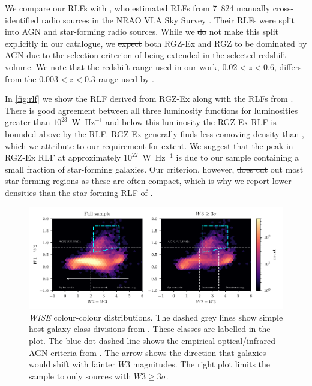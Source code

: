 \documentclass[11pt, a4paper]{book}
\providecommand{\DIFaddtex}[1]{{\protect\color{blue}\uwave{#1}}} %
\providecommand{\DIFdeltex}[1]{{\protect\color{red}\sout{#1}}}                      %
\providecommand{\DIFaddbegin}{} %
\providecommand{\DIFaddend}{} %
\providecommand{\DIFdelbegin}{} %
\providecommand{\DIFdelend}{} %
\providecommand{\DIFadd}[1]{\texorpdfstring{\DIFaddtex{#1}}{#1}} %
\providecommand{\DIFdel}[1]{\texorpdfstring{\DIFdeltex{#1}}{}} %
\newcommand{\DIFscaledelfig}{0.5}
\newlength{\DIFdelgraphicswidth} %
\newlength{\DIFdelgraphicsheight} %
\newcommand{\DIFaddincludegraphics}[2][]{{\color{blue}\fbox{\DIFOincludegraphics[#1]{#2}}}} %
\newcommand{\DIFdelincludegraphics}[2][]{%
\sbox{\DIFdelgraphicsbox}{\DIFOincludegraphics[#1]{#2}}%
\settoboxwidth{\DIFdelgraphicswidth}{\DIFdelgraphicsbox} %
\settoboxtotalheight{\DIFdelgraphicsheight}{\DIFdelgraphicsbox} %
\scalebox{\DIFscaledelfig}{%
\parbox[b]{\DIFdelgraphicswidth}{\usebox{\DIFdelgraphicsbox}\\[-\baselineskip] \rule{\DIFdelgraphicswidth}{0em}}\llap{\resizebox{\DIFdelgraphicswidth}{\DIFdelgraphicsheight}{%
\setlength{\unitlength}{\DIFdelgraphicswidth}%
\begin{picture}(1,1)%
\thicklines\linethickness{2pt} %
{\color[rgb]{1,0,0}\put(0,0){\framebox(1,1){}}}%
{\color[rgb]{1,0,0}\put(0,0){\line( 1,1){1}}}%
{\color[rgb]{1,0,0}\put(0,1){\line(1,-1){1}}}%
\end{picture}%
}\hspace*{3pt}}} %
} %
\DeclareRobustCommand{\DIFaddbegin}{\DIFOaddbegin \let\includegraphics\DIFaddincludegraphics} %
\DeclareRobustCommand{\DIFaddend}{\DIFOaddend \let\includegraphics\DIFOincludegraphics} %
\DeclareRobustCommand{\DIFdelbegin}{\DIFOdelbegin \let\includegraphics\DIFdelincludegraphics} %
\DeclareRobustCommand{\DIFdelend}{\DIFOaddend \let\includegraphics\DIFOincludegraphics} %
\begin{document}
  We \DIFdelbegin \DIFdel{compare }\DIFdelend \DIFaddbegin \DIFadd{compared }\DIFaddend our RLFs with \citet{mauch07rlf}, who estimated RLFs from \DIFdelbegin \DIFdel{7~824
  }\DIFdelend \DIFaddbegin \DIFadd{7824
  }\DIFaddend manually cross-identified radio sources in the NRAO VLA Sky Survey \citep[NVSS;][]{condon98nvss}.
  Their RLFs were split into AGN and star-forming radio sources. While we
  \DIFdelbegin \DIFdel{do }\DIFdelend \DIFaddbegin \DIFadd{did }\DIFaddend not make this split explicitly in our catalogue, we \DIFdelbegin \DIFdel{expect }\DIFdelend \DIFaddbegin \DIFadd{expected }\DIFaddend both RGZ-Ex
  and RGZ to be dominated by AGN due to the selection criterion of being extended in the selected redshift volume. We note that the redshift range used in our work, $0.02 < z < 0.6$, differs from the $0.003 < z < 0.3$ range used by \citet{mauch07rlf}.

  In \autoref{fig:rlf} we show the RLF derived from RGZ-Ex along with the RLFs from \citet{mauch07rlf}. There is good
  agreement between all three luminosity functions for luminosities greater than $10^{23}$~W~Hz$^{-1}$
  and below this luminosity the RGZ-Ex RLF is bounded above by the
  \citet{mauch07rlf} RLF. RGZ-Ex generally finds less comoving density than \citet{mauch07rlf}, which we attribute to our requirement for extent. We suggest that the peak in RGZ-Ex RLF at approximately $10^{22}$~W~Hz$^{-1}$ is due to our sample containing a small fraction of star-forming galaxies. Our criterion, however, \DIFdelbegin \DIFdel{does cut }\DIFdelend \DIFaddbegin \DIFadd{cuts }\DIFaddend out most star-forming regions as these are often compact, which is why we report lower densities than the star-forming RLF of \citet{mauch07rlf}.

\begin{figure}
    \centering
    \includegraphics[width=\linewidth]{rlf-images/colour-colour.pdf}
    \caption[\emph{WISE} colour-colour distributions.]{\emph{WISE} colour-colour distributions. The dashed grey lines show
      simple host galaxy class divisions from \citet{jarrett17wise}. These
      classes are labelled in the plot. The blue dot-dashed line shows
      the empirical optical/infrared AGN criteria from \citet{jarrett11wise}. The arrow shows the direction that galaxies would shift with fainter $W3$ magnitudes. The right plot limits the sample to only sources with $W3 \geq 3 \sigma$.
      \label{fig:colour-colour}}
  \end{figure}
\end{document}
